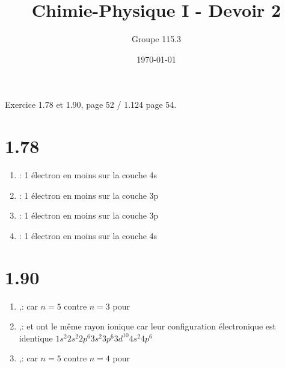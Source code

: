 \documentclass{article}
\title{Chimie-Physique I - Devoir 2}
\author{Groupe 115.3}
\date{\today}
\begin{document}
\maketitle

Exercice 1.78 et 1.90, page 52 / 1.124 page 54.

\section{1.78}

\begin{enumerate}
  \item {} : 1 électron en moins sur la couche 4s
  \item {}: 1 électron en moins sur la couche 3p
  \item {}: 1 électron en moins sur la couche 3p
  \item {}: 1 électron en moins sur la couche 4s
\end{enumerate}

\section{1.90}

\begin{enumerate}

\item {},:  car $n = 5$ contre $n = 3$ pour  
\item {},:  et  ont le même rayon ionique 
car leur configuration électronique est identique $1s^2 2s^2 2p^6 3s^2 3p^6 3d^{10}4s^2 4p^6 $ 
\item {},:  car $n = 5$ contre $n = 4$ pour  


\end{enumerate}
\begin{chemmath}

\end{chemmath}
\end{document}

